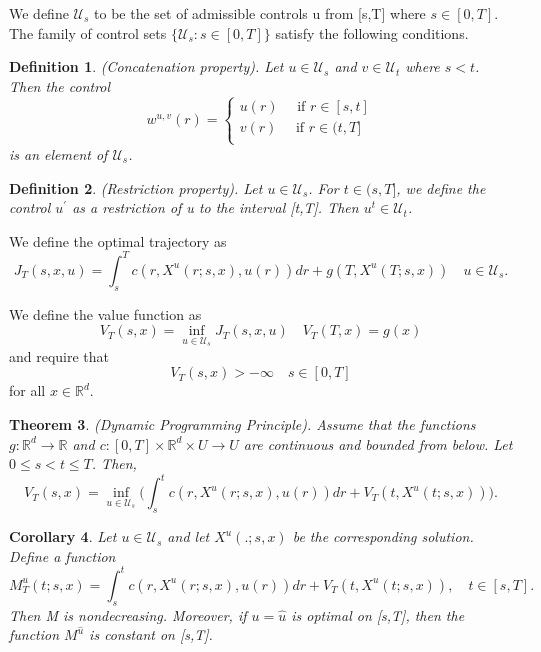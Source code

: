 \documentclass[twoside]{article}
\newcounter{lecnum}
\newtheorem{theorem}{Theorem}[lecnum]
\newtheorem{corollary}[theorem]{Corollary}
\newtheorem{definition}[theorem]{Definition}
\begin{document}
We define $\mathcal{U}_s$ to be the set of admissible controls u from [s,T] where $s \in [0,T]$.\\

The family of control sets $\{\mathcal{U}_s: s \in [0,T]\}$ satisfy the following conditions.

\begin{definition}(Concatenation property). Let $u \in \mathcal{U}_s$ and $v \in \mathcal{U}_t$ where $s < t$. Then the control 
$$
w^{u,v}(r) = \begin{cases}
u(r) \quad \text{ if } r \in [s,t]\\
v(r) \quad \text{ if } r \in (t,T]\\
\end{cases}
$$
is an element of $\mathcal{U}_s$.
\end{definition}

\begin{definition}(Restriction property). Let $u \in \mathcal{U}_s$. For $t \in (s,T]$, we define the control $u^'$ as a restriction of u to the interval [t,T]. Then $u^t \in \mathcal{U}_t$.
\end{definition}

We define the optimal trajectory as 
$$
J_T(s,x,u) = \int_s^Tc(r,X^u(r;s,x),u(r))dr + g(T,X^u(T;s,x)) \quad u \in \mathcal{U}_s.
$$

We define the value function as
$$
V_T(s,x) = \inf_{u \in \mathcal{U}_s}J_T(s,x,u) \quad V_T(T,x) = g(x)
$$
and require that 
$$
V_T(s,x) > -\infty \quad s \in [0,T]
$$
for all $x \in \mathbb{R}^d$.

\begin{theorem}(Dynamic Programming Principle). Assume that the functions $g: \mathbb{R}^d \rightarrow \mathbb{R}$ and $c: [0,T] \times \mathbb{R}^d \times U \rightarrow U$ are continuous and bounded from below. Let $0 \leq s < t \leq T$. Then,
$$
V_T(s,x) = \inf_{u \in \mathcal{U}_s} \bigg( \int_{s}^{t}c(r, X^u(r;s,x), u(r))dr + V_T(t,X^u(t;s,x)) \bigg).
$$
\end{theorem}

\begin{corollary}Let $u \in \mathcal{U}_s$ and let $X^u(.;s,x)$ be the corresponding solution. Define a function 
$$
M_{T}^u(t;s,x) = \int_s^tc(r, X^u(r;s,x), u(r))dr + V_T(t,X^u(t;s,x)), \quad t \in [s,T].
$$
Then M is nondecreasing. Moreover, if $u = \hat{u}$ is optimal on [s,T], then the function $M^{\hat{u}}$ is constant on [s,T].
\end{corollary}
\end{document}
